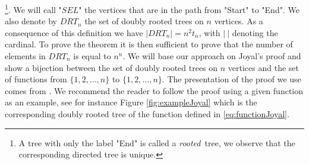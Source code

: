 \footnote{A tree with only the label "End" is called a \emph{rooted} tree, we observe that the corresponding directed tree is unique.}.
We will call "$SEL$" the vertices that are in the path from "Start" to "End". 
We also denote by $DRT_n$ the set of doubly rooted trees on $n$ vertices.
\newline
As a consequence of this definition we have $|DRT_n| = n^2 t_n$, with $|\ |$ denoting the cardinal. 
To prove the theorem it is then sufficient to prove that the number of elements in $DRT_n$ is equal to $n^n$.
We will base our approach on Joyal's proof \cite{joyal} and show a bijection between the set of doubly rooted trees on $n$ vertices and the set of functions from $\{1, 2, \ldots, n\}$ to $\{1, 2, \ldots, n\}$.
The presentation of the proof we use comes from \cite{JoyalProof}.
We recommend the reader to follow the proof using a given function as an example, see for instance Figure \ref{fig:exampleJoyal} which is the corresponding doubly rooted tree of the function defined in \eqref{eq:functionJoyal}.
